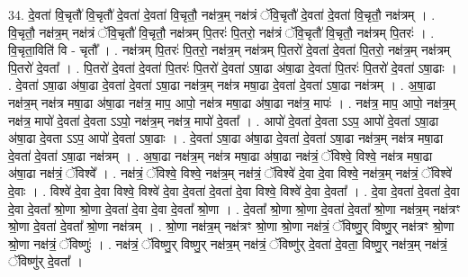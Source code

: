 \documentclass[17pt]{extarticle}
\begin{document}
34. दे॒वता॑ वि॒चृतौ॑ वि॒चृतौ॑ दे॒वता॑ दे॒वता॑ वि॒चृतौ॒ नक्ष॑त्र॒म् नक्ष॑त्रं ॅवि॒चृतौ॑ दे॒वता॑ दे॒वता॑ वि॒चृतौ॒ नक्ष॑त्रम् । . वि॒चृतौ॒ नक्ष॑त्र॒म् नक्ष॑त्रं ॅवि॒चृतौ॑ वि॒चृतौ॒ नक्ष॑त्रम् पि॒तरः॑ पि॒तरो॒ नक्ष॑त्रं ॅवि॒चृतौ॑ वि॒चृतौ॒ नक्ष॑त्रम् पि॒तरः॑ । . वि॒चृता॒विति॑ वि - चृतौ᳚ । . नक्ष॑त्रम् पि॒तरः॑ पि॒तरो॒ नक्ष॑त्र॒म् नक्ष॑त्रम् पि॒तरो॑ दे॒वता॑ दे॒वता॑ पि॒तरो॒ नक्ष॑त्र॒म् नक्ष॑त्रम् पि॒तरो॑ दे॒वता᳚ । . पि॒तरो॑ दे॒वता॑ दे॒वता॑ पि॒तरः॑ पि॒तरो॑ दे॒वता॑ ऽषा॒ढा अ॑षा॒ढा दे॒वता॑ पि॒तरः॑ पि॒तरो॑ दे॒वता॑ ऽषा॒ढाः । . दे॒वता॑ ऽषा॒ढा अ॑षा॒ढा दे॒वता॑ दे॒वता॑ ऽषा॒ढा नक्ष॑त्र॒म् नक्ष॑त्र मषा॒ढा दे॒वता॑ दे॒वता॑ ऽषा॒ढा नक्ष॑त्रम् । . अ॒षा॒ढा नक्ष॑त्र॒म् नक्ष॑त्र मषा॒ढा अ॑षा॒ढा नक्ष॑त्र॒ माप॒ आपो॒ नक्ष॑त्र मषा॒ढा अ॑षा॒ढा नक्ष॑त्र॒ मापः॑ । . नक्ष॑त्र॒ माप॒ आपो॒ नक्ष॑त्र॒म् नक्ष॑त्र॒ मापो॑ दे॒वता॑ दे॒वता ऽऽपो॒ नक्ष॑त्र॒म् नक्ष॑त्र॒ मापो॑ दे॒वता᳚ । . आपो॑ दे॒वता॑ दे॒वता ऽऽप॒ आपो॑ दे॒वता॑ ऽषा॒ढा अ॑षा॒ढा दे॒वता ऽऽप॒ आपो॑ दे॒वता॑ ऽषा॒ढाः । . दे॒वता॑ ऽषा॒ढा अ॑षा॒ढा दे॒वता॑ दे॒वता॑ ऽषा॒ढा नक्ष॑त्र॒म् नक्ष॑त्र मषा॒ढा दे॒वता॑ दे॒वता॑ ऽषा॒ढा नक्ष॑त्रम् । . अ॒षा॒ढा नक्ष॑त्र॒म् नक्ष॑त्र मषा॒ढा अ॑षा॒ढा नक्ष॑त्रं॒ ॅविश्वे॒ विश्वे॒ नक्ष॑त्र मषा॒ढा अ॑षा॒ढा नक्ष॑त्रं॒ ॅविश्वे᳚ । . नक्ष॑त्रं॒ ॅविश्वे॒ विश्वे॒ नक्ष॑त्र॒म् नक्ष॑त्रं॒ ॅविश्वे॑ दे॒वा दे॒वा विश्वे॒ नक्ष॑त्र॒म् नक्ष॑त्रं॒ ॅविश्वे॑ दे॒वाः । . विश्वे॑ दे॒वा दे॒वा विश्वे॒ विश्वे॑ दे॒वा दे॒वता॑ दे॒वता॑ दे॒वा विश्वे॒ विश्वे॑ दे॒वा दे॒वता᳚ । . दे॒वा दे॒वता॑ दे॒वता॑ दे॒वा दे॒वा दे॒वता᳚ श्रो॒णा श्रो॒णा दे॒वता॑ दे॒वा दे॒वा दे॒वता᳚ श्रो॒णा । . दे॒वता᳚ श्रो॒णा श्रो॒णा दे॒वता॑ दे॒वता᳚ श्रो॒णा नक्ष॑त्र॒म् नक्ष॑त्रꣳ श्रो॒णा दे॒वता॑ दे॒वता᳚ श्रो॒णा नक्ष॑त्रम् । . श्रो॒णा नक्ष॑त्र॒म् नक्ष॑त्रꣳ श्रो॒णा श्रो॒णा नक्ष॑त्रं॒ ॅविष्णु॒र् विष्णु॒र् नक्ष॑त्रꣳ श्रो॒णा 
श्रो॒णा नक्ष॑त्रं॒ ॅविष्णुः॑ । . नक्ष॑त्रं॒ ॅविष्णु॒र् विष्णु॒र् नक्ष॑त्र॒म् नक्ष॑त्रं॒ ॅविष्णु॑र् दे॒वता॑ दे॒वता॒ विष्णु॒र् नक्ष॑त्र॒म् नक्ष॑त्रं॒ ॅविष्णु॑र् दे॒वता᳚ । \newline
\end{document}

